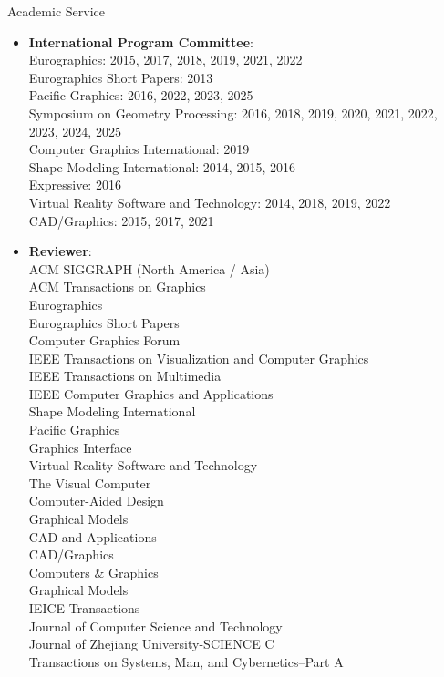 {\Large\sc Academic Service}
\vspace{-3mm}
\begin{itemize}
\item {\bf International Program Committee}:\\
Eurographics: 2015, 2017, 2018, 2019, 2021, 2022\\
Eurographics Short Papers: 2013\\
Pacific Graphics: 2016, 2022, 2023, 2025\\
Symposium on Geometry Processing: 2016, 2018, 2019, 2020, 2021, 2022, 2023, 2024, 2025\\
Computer Graphics International: 2019\\
Shape Modeling International: 2014, 2015, 2016\\
Expressive: 2016\\
Virtual Reality Software and Technology: 2014, 2018, 2019, 2022\\
CAD/Graphics: 2015, 2017, 2021\\

\item {\bf Reviewer}:\\
ACM SIGGRAPH (North America / Asia)\\
ACM Transactions on Graphics\\
Eurographics\\
Eurographics Short Papers\\
Computer Graphics Forum\\
IEEE Transactions on Visualization and Computer Graphics\\
IEEE Transactions on Multimedia\\
IEEE Computer Graphics and Applications\\
Shape Modeling International\\
Pacific Graphics\\
Graphics Interface\\
Virtual Reality Software and Technology\\
The Visual Computer\\
Computer-Aided Design\\
Graphical Models\\
CAD and Applications\\
CAD/Graphics\\
Computers \& Graphics\\
Graphical Models\\
IEICE Transactions\\
Journal of Computer Science and Technology\\
Journal of Zhejiang University-SCIENCE C\\
Transactions on Systems, Man, and Cybernetics--Part A
\end{itemize}
